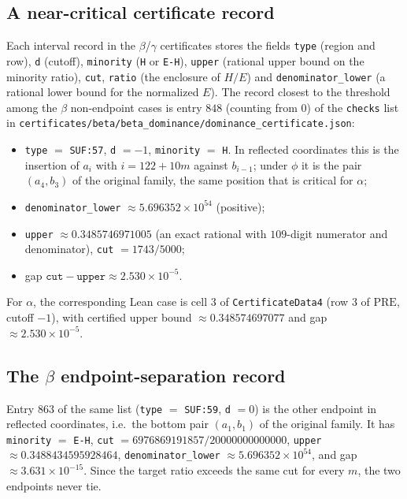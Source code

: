 \documentclass[11pt]{amsart}
\theoremstyle{definition}
\theoremstyle{remark}
\begin{document}
\subsection*{A near-critical certificate record}
Each interval record in the $\beta$/$\gamma$ certificates stores the fields \texttt{type} (region and row), \texttt{d} (cutoff), \texttt{minority} (\texttt{H} or \texttt{E-H}), \texttt{upper} (rational upper bound on the minority ratio), \texttt{cut}, \texttt{ratio} (the enclosure of $H/E$) and \texttt{denominator\_lower} (a rational lower bound for the normalized $E$). The record closest to the threshold among the $\beta$ non-endpoint cases is entry $848$ (counting from $0$) of the \texttt{checks} list in \texttt{certificates/beta/beta\_dominance/dominance\_certificate.json}:
\begin{itemize}
\item \texttt{type} $=$ \texttt{SUF:57}, \texttt{d} $=-1$, \texttt{minority} $=$ \texttt{H}. In reflected coordinates this is the insertion of $a_i$ with $i=122+10m$ against $b_{i-1}$; under $\phi$ it is the pair $(a_4,b_3)$ of the original family, the same position that is critical for $\alpha$;
\item \texttt{denominator\_lower} $\approx5.696352\times10^{54}$ (positive);
\item \texttt{upper} $\approx0.3485746971005$ (an exact rational with $109$-digit numerator and denominator), \texttt{cut} $=1743/5000$;
\item gap $\texttt{cut}-\texttt{upper}\approx2.530\times10^{-5}$.
\end{itemize}
For $\alpha$, the corresponding Lean case is cell $3$ of \texttt{CertificateData4} (row $3$ of $\mathrm{PRE}$, cutoff $-1$), with certified upper bound $\approx0.348574697077$ and gap $\approx2.530\times10^{-5}$.

\subsection*{The $\beta$ endpoint-separation record}
Entry $863$ of the same list (\texttt{type} $=$ \texttt{SUF:59}, \texttt{d} $=0$) is the other endpoint in reflected coordinates, i.e.\ the bottom pair $(a_1,b_1)$ of the original family. It has \texttt{minority} $=$ \texttt{E-H}, \texttt{cut} $=6976869191857/20000000000000$, \texttt{upper} $\approx0.3488434595928464$, \texttt{denominator\_lower} $\approx5.696352\times10^{54}$, and gap $\approx3.631\times10^{-15}$. Since the target ratio exceeds the same cut for every $m$, the two endpoints never tie.
\end{document}
